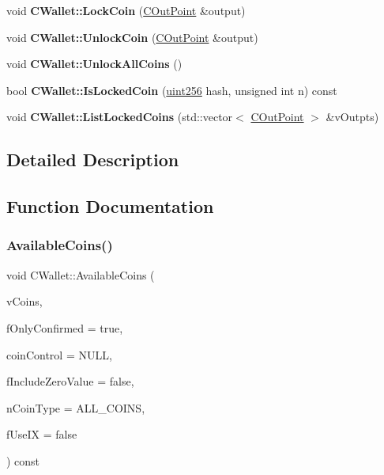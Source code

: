 \begin{DoxyCompactItemize}
void {\bfseries C\+Wallet\+::\+Lock\+Coin} (\mbox{\hyperlink{class_c_out_point}{C\+Out\+Point}} \&output)
\item 
\mbox{\label{group___actions_gabd60f5b890e2c62c05c6a2de6322197f}} 
void {\bfseries C\+Wallet\+::\+Unlock\+Coin} (\mbox{\hyperlink{class_c_out_point}{C\+Out\+Point}} \&output)
\item 
\mbox{\label{group___actions_gab51d80d53bc30799dd6888868a553963}} 
void {\bfseries C\+Wallet\+::\+Unlock\+All\+Coins} ()
\item 
\mbox{\label{group___actions_ga58abc6e61537f10bfb9429587ed29074}} 
bool {\bfseries C\+Wallet\+::\+Is\+Locked\+Coin} (\mbox{\hyperlink{classuint256}{uint256}} hash, unsigned int n) const
\item 
\mbox{\label{group___actions_ga41f4c77a0843692388f8b11d5fb88042}} 
void {\bfseries C\+Wallet\+::\+List\+Locked\+Coins} (std\+::vector$<$ \mbox{\hyperlink{class_c_out_point}{C\+Out\+Point}} $>$ \&v\+Outpts)
\end{DoxyCompactItemize}


\subsection{Detailed Description}


\subsection{Function Documentation}
\mbox{\label{group___actions_ga8110e889be0f5915104e07bfe3839c68}} 
\subsubsection{\texorpdfstring{Available\+Coins()}{AvailableCoins()}}
{\footnotesize\ttfamily void C\+Wallet\+::\+Available\+Coins (\begin{DoxyParamCaption}\item[{std\+::vector$<$ \mbox{\hyperlink{class_c_output}{C\+Output}} $>$ \&}]{v\+Coins,  }\item[{bool}]{f\+Only\+Confirmed = {\ttfamily true},  }\item[{const \mbox{\hyperlink{class_c_coin_control}{C\+Coin\+Control}} $\ast$}]{coin\+Control = {\ttfamily NULL},  }\item[{bool}]{f\+Include\+Zero\+Value = {\ttfamily false},  }\item[{Available\+Coins\+Type}]{n\+Coin\+Type = {\ttfamily ALL\+\_\+COINS},  }\item[{bool}]{f\+Use\+IX = {\ttfamily false} }\end{DoxyParamCaption}) const}

